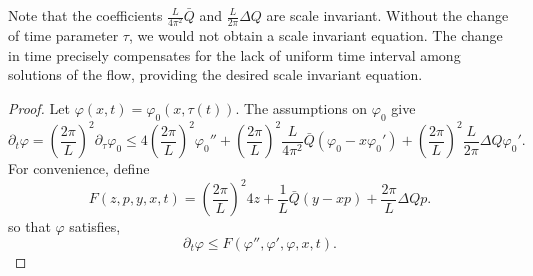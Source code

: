 \documentclass[11pt]{amsart}
\begin{document}
\begin{remark}
Note that the coefficients $\tfrac{L}{4\pi^2} \bar{Q}$ and $\tfrac{L}{2\pi}\Delta Q$ are scale invariant. Without the change of time parameter $\tau$, we would not obtain a scale invariant equation. The change in time precisely compensates for the lack of uniform time interval among solutions of the flow, providing the desired scale invariant equation.
\end{remark}

\begin{proof}
Let $\varphi(x, t) = \varphi_0(x, \tau(t))$. The assumptions on $\varphi_0$ give
\[
\partial_t \varphi = \left(\frac{2\pi}{L}\right)^2 \partial_{\tau} \varphi_0 \leq 4 \left(\frac{2\pi}{L}\right)^2 \varphi_0'' + \left(\frac{2\pi}{L}\right)^2 \frac{L}{4\pi^2} \bar{Q} (\varphi_0 - x \varphi_0') + \left(\frac{2\pi}{L}\right)^2 \frac{L}{2\pi} \Delta Q \varphi_0'.
\]
For convenience, define
\[
F(z, p, y, x, t) = \left(\frac{2\pi}{L}\right)^2 4 z + \frac{1}{L} \bar{Q} (y - x p) + \frac{2\pi}{L} \Delta Q p.
\]
so that $\varphi$ satisfies,
\begin{equation}
\label{eq:comparison_diff_ineq_leq}
\partial_t \varphi \leq F(\varphi'', \varphi', \varphi, x, t).
\end{equation}


\end{proof}
\end{document}
